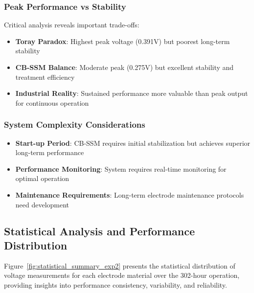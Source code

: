 \documentclass[12pt,a4paper]{article}
\begin{document}
\subsubsection{Peak Performance vs Stability}

Critical analysis reveals important trade-offs:

\begin{itemize}
    \item \textbf{Toray Paradox}: Highest peak voltage (0.391V) but poorest long-term stability
    \item \textbf{CB-SSM Balance}: Moderate peak (0.275V) but excellent stability and treatment efficiency
    \item \textbf{Industrial Reality}: Sustained performance more valuable than peak output for continuous operation
\end{itemize}

\subsubsection{System Complexity Considerations}

\begin{itemize}
    \item \textbf{Start-up Period}: CB-SSM requires initial stabilization but achieves superior long-term performance
    \item \textbf{Performance Monitoring}: System requires real-time monitoring for optimal operation
    \item \textbf{Maintenance Requirements}: Long-term electrode maintenance protocols need development
\end{itemize}

\subsection{Statistical Analysis and Performance Distribution}

Figure~\ref{fig:statistical_summary_exp2} presents the statistical distribution of voltage measurements for each electrode material over the 302-hour operation, providing insights into performance consistency, variability, and reliability.
\end{document}
